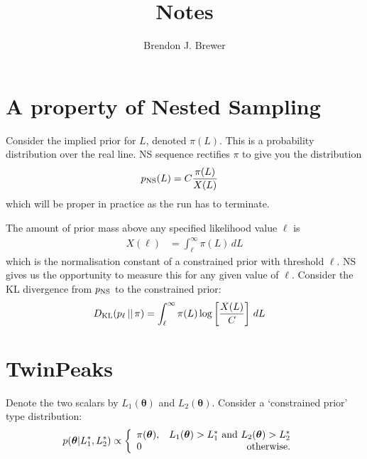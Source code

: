 \documentclass[a4paper, 12pt]{article}
\title{Notes}
\author{Brendon J. Brewer}
\date{}
\newcommand{\btheta}{\boldsymbol{\theta}}
\begin{document}
\maketitle

\setlength{\parindent}{0pt}
\setlength{\parskip}{8pt}

\section*{A property of Nested Sampling}
Consider the implied prior for $L$, denoted $\pi(L)$. This is
a probability distribution over the real line.
NS sequence rectifies $\pi$ to give you the distribution
\begin{align}
p_{\rm NS}(L) &= C \frac{\pi(L)}{X(L)}
\end{align}
which will be proper in practice as the run has to terminate.

The amount of prior mass above any specified likelihood value
$\ell$ is
\begin{align}
X(\ell) &= \int_{\ell}^{\infty} \pi(L) \, dL 
\end{align}
which is the normalisation constant of a constrained prior with
threshold $\ell$.
NS gives us the opportunity to measure this for any given
value of $\ell$. Consider the KL divergence from $p_{\rm NS}$ to
the constrained prior:
\begin{align}
D_{\rm KL}(p_\ell \,||\, \pi)
  &= \int_{\ell}^{\infty} \pi(L)
           \log\left[\frac{X(L)}{C}\right] \, dL
\end{align}


\section*{TwinPeaks}
Denote the two scalars by $L_1(\btheta)$ and $L_2(\btheta)$.
Consider a `constrained prior' type distribution:
\begin{align}
p(\btheta | L_1^*, L_2^*) &\propto
    \left\{
        \begin{array}{lr}
            \pi(\btheta), & L_1(\btheta) > L_1^* \textnormal{ and }
                            L_2(\btheta) > L_2^* \\
            0             & \textnormal{otherwise}.
        \end{array}
    \right.
\end{align}

\end{document}
